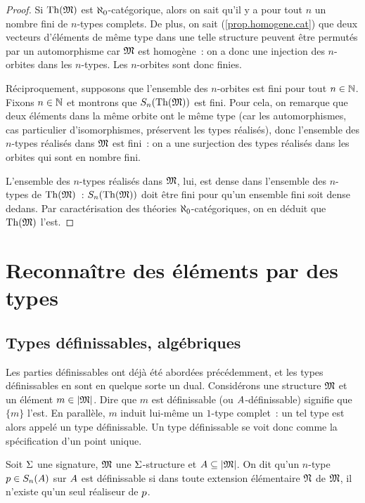 \begin{proof}
  Si $\operatorname{Th}(\mathfrak{M})$ est $\aleph_0$-catégorique, alors on sait qu'il y a pour
  tout $n$ un nombre fini de $n$-types complets. De plus, on sait
  (\cref{prop.homogene.cat}) que deux vecteurs d'éléments de même type dans une
  telle structure peuvent être permutés par un automorphisme car $\mathfrak{M}$ est
  homogène~: on a donc une injection des $n$-orbites dans les $n$-types. Les
  $n$-orbites sont donc finies.

  Réciproquement, supposons que l'ensemble des $n$-orbites est fini pour tout
  $n\in\mathbb N$. Fixons $n \in \mathbb N$ et montrons que $S_{n}(\operatorname{Th}(\mathfrak{M}))$ est
  fini. Pour cela, on remarque que deux éléments dans la même orbite ont le
  même type (car les automorphismes, cas particulier d'isomorphismes, préservent
  les types réalisés), donc l'ensemble des $n$-types réalisés dans $\mathfrak{M}$ est
  fini~: on a une surjection des types réalisés dans les orbites qui sont en
  nombre fini.

  L'ensemble des $n$-types réalisés dans $\mathfrak{M}$, lui, est dense dans
  l'ensemble des $n$-types de $\operatorname{Th}(\mathfrak{M})$~: $S_{n}(\operatorname{Th}(\mathfrak{M}))$ doit
  être fini pour qu'un ensemble fini soit dense dedans. Par caractérisation des
  théories $\aleph_0$-catégoriques, on en déduit que $\operatorname{Th}(\mathfrak{M})$ l'est.
\end{proof}

\section{Reconnaître des éléments par des types}

\subsection{Types définissables, algébriques}

Les parties définissables ont déjà été abordées précédemment, et les types
définissables en sont en quelque sorte un dual. Considérons une structure
$\mathfrak{M}$ et un élément $m\in\left\vert \mathfrak{M}\right\vert$. Dire que $m$ est définissable (ou
$A$-définissable) signifie que $\{m\}$ l'est. En parallèle, $m$ induit
lui-même un $1$-type complet~: un tel type est alors appelé un type
définissable. Un type définissable se voit donc comme la spécification d'un
point unique.

\begin{definition}
  Soit $\Sigma$ une signature, $\mathfrak{M}$ une $\Sigma$-structure et
  $A\subseteq\left\vert \mathfrak{M}\right\vert$. On dit qu'un $n$-type $p\in S_{n}(A)$
  sur $A$ est définissable si dans toute extension élémentaire $\mathfrak{N}$ de
  $\mathfrak{M}$, il n'existe qu'un seul réaliseur de $p$.
\end{definition}

